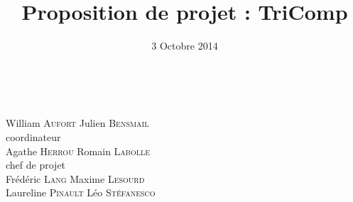 \documentclass{article}
\title{Proposition de projet : TriComp}
\author{}
\date{3 Octobre 2014}
\begin{document}
\makeatletter %
  \begin{titlepage}
    \begin{center}
       \vfill
       {\Huge \@title} \\
       \vspace{2cm}
       {\large \@date}
       \vspace{6cm}
    \end{center}
       {\Large
       {William \textsc{Aufort} \hfill Julien \textsc{Bensmail} \\}
	\vspace{1cm}
       {\hfill coordinateur \\}
       {Agathe \textsc{Herrou}  \hfill Romain \textsc{Labolle} \\}
       \vspace{1cm}
       {chef de projet \\}
       \vspace{1.5cm}
       {Frédéric \textsc{Lang} \hfill Maxime \textsc{Lesourd} \\}
       {Laureline \textsc{Pinault} \hfill Léo \textsc{Stéfanesco}}}
  \end{titlepage}
\makeatother

\pagebreak

%



\end{document}
